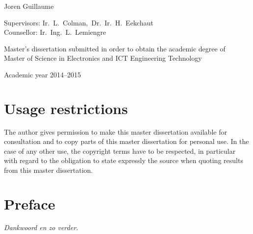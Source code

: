 \documentclass[11pt,british]{article}
\begin{document}
\begin{titlepage}
\begin{center}
Joren Guillaume

\fontsize{12pt}{14pt}
\selectfont

\vspace{3.5cm}

Supervisors: Ir.~L.~Colman,~Dr.~Ir.~H.~Eekchaut\\
Counsellor: Ir.~Ing.~L.~Lemiengre\\

\vspace{2cm}

Master's dissertation submitted in order to obtain the academic degree of\\
Master of Science in Electronics and ICT Engineering Technology

\vspace{1cm}

Academic year 2014--2015

\end{center}
\end{titlepage}


%


\newpage{}
\part*{Usage restrictions}

The author gives permission to make this master dissertation available for consultation 
and to copy parts of this master dissertation for personal use. 
 In the case of any other use, the copyright terms have to be respected, in particular with regard to 
the obligation to state expressly the source when quoting results from this master dissertation.

\pagebreak{}


\newpage{}\part*{Preface}
\emph{\color{red}Dankwoord en zo verder.}
\pagebreak{}


\newpage{}
\begin{abstract}
\end{abstract}
\end{document}

